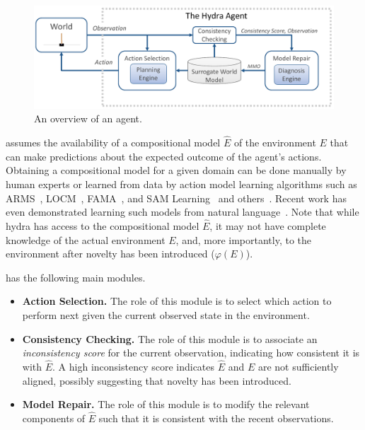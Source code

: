 \documentclass{article}
\begin{document}
\begin{figure}
	\centering
	\includegraphics[width=\columnwidth]{hydra-cropped.pdf}
	\caption{An overview of an \hydra agent.}
	\label{fig:hydra-overview}
\end{figure}

\hydra assumes the availability of a compositional model $\hat{E}$ of the environment $E$ that can make predictions about the expected outcome of the agent's actions. 
Obtaining a compositional model for a given domain can be done manually by human experts  
or learned from data by action model learning algorithms such as ARMS~\cite{wu2007arms}, LOCM~\cite{cresswell2013acquiring}, FAMA~\cite{aineto19learning}, and SAM Learning~\cite{juba2021kr} and others~\cite{asai2020learning}. 
Recent work has even demonstrated learning such models from natural language~\cite{feng2018extracting,lindsay2017framer}. 
Note that while hydra has access to the compositional model $\hat{E}$, it may not have complete knowledge of the actual environment $E$, and, more importantly, to the environment after novelty has been introduced ($\varphi(E)$). 


\noindent \hydra has the following main modules. 
\begin{itemize}
\item \textbf{Action Selection.} The role of this module is to select which action to perform next given the current observed state in the environment.
\item \textbf{Consistency Checking.} The role of this module is to associate an \emph{inconsistency score} for the current observation, indicating how consistent it is with $\hat{E}$. A high inconsistency score indicates $\hat{E}$ and $E$ are not sufficiently aligned, possibly suggesting that novelty has been introduced. 
\item \textbf{Model Repair.} The role of this module is to modify the relevant components of $\hat{E}$ such that it is consistent with the recent observations. 
\end{itemize}
\end{document}
